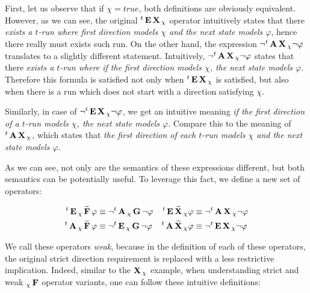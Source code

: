 First, let us observe that if $\chi = true$, both definitions are obviously equivalent. However, as we can see, the original ${}^{t}\operatorname{\mathbf{E}}\operatorname{\mathbf{X}}{}_{\chi}$ operator intuitively states that there \emph{exists a $t$-run where first direction models $\chi$ and the next state models $\varphi$}, hence there really must exists such run. On the other hand, the expression $\neg {}^{t}\operatorname{\mathbf{A}}\operatorname{\mathbf{X}}{}_{\chi} \neg \varphi$ translates to a slightly different statement. Intuitively, $\neg {}^{t}\operatorname{\mathbf{A}}\operatorname{\mathbf{X}}{}_{\chi} \neg \varphi$ states that there \emph{exists a $t$-run where if the first direction models $\chi$, the next state models $\varphi$}. Therefore this formula is satisfied not only when ${}^{t}\operatorname{\mathbf{E}}\operatorname{\mathbf{X}}{}_{\chi}$ is satisfied, but also when there is a run which does not start with a direction satisfying $\chi$.

Similarly, in case of $\neg {}^{t}\operatorname{\mathbf{E}}\operatorname{\mathbf{X}}{}_{\chi} \neg \varphi$, we get an intuitive meaning \emph{if the first direction of a $t$-run models $\chi$, the next state models $\varphi$}. Compare this to the meaning of ${}^{t}\operatorname{\mathbf{A}}\operatorname{\mathbf{X}}{}_{\chi}$, which states that \emph{the first direction of each $t$-run models $\chi$ and the next state models $\varphi$}.

As we can see, not only are the semantics of these expressions different, but both semantics can be potentially useful. To leverage this fact, we define a new set of operators:

\begin{align*}
	{}^{t}\operatorname{\mathbf{E}}{}_{\chi}\operatorname{\mathbf{\widetilde{F}}} \varphi & \equiv \neg {}^{t}\operatorname{\mathbf{A}}{}_{\chi}\operatorname{\mathbf{G}} \neg \varphi &
	{}^{t}\operatorname{\mathbf{E}}\operatorname{\mathbf{\widetilde{X}}}{}_{\chi} \varphi & \equiv \neg {}^{t}\operatorname{\mathbf{A}}\operatorname{\mathbf{X}}{}_{\chi} \neg \varphi \\	
	{}^{t}\operatorname{\mathbf{A}}{}_{\chi}\operatorname{\mathbf{\widetilde{F}}} \varphi & \equiv \neg {}^{t}\operatorname{\mathbf{E}}{}_{\chi}\operatorname{\mathbf{G}} \neg \varphi &
	{}^{t}\operatorname{\mathbf{A}}\operatorname{\mathbf{\widetilde{X}}}{}_{\chi} \varphi & \equiv \neg {}^{t}\operatorname{\mathbf{E}}\operatorname{\mathbf{X}}{}_{\chi} \neg \varphi \\
\end{align*}

We call these operators \emph{weak}, because in the definition of each of these operators, the original strict direction requirement is replaced with a less restrictive implication. Indeed, similar to the $\operatorname{\mathbf{X}}{}_{\chi}$ example, when understanding strict and weak ${}_{\chi}\operatorname{\mathbf{F}}$ operator variants, one can follow these intuitive definitions:

